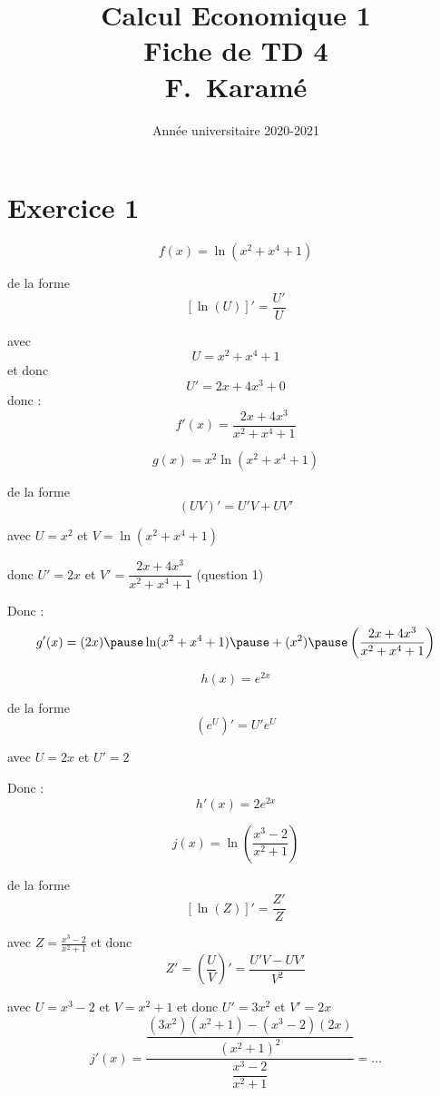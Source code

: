 \documentclass[9pt,handout,professionalfonts,hyperref]{beamer}
\title{Calcul Economique 1\\Fiche de TD 4\\F.~Karamé}
\date{Année universitaire 2020-2021}
\begin{document}
\begin{frame}
\titlepage
\end{frame}

\section{Exercice 1}

\begin{frame}
$$f(x)=\ln(x^2+x^4+1)$$

\pause de la forme $$[\ln(U)]'=\frac{U'}{U}$$

\pause
avec $$U=x^2+x^4+1$$
et donc  
\pause $$U'=2x+4x^3+0$$
\medskip
\pause donc :
\pause
$$f'(x)=\dfrac{2x+4x^3}{x^2+x^4+1}$$

\end{frame}

\begin{frame}

$$
g(x)=x^2\ln(x^2+x^4+1)
$$

\pause de la forme $$(UV)'=U'V+UV'$$

\medskip
 
\pause avec $U=x^2$ et $V=\ln(x^2+x^4+1)$

\pause
\medskip

donc $U'=2x$ \pause et $V'=\dfrac{2x+4x^3}{x^2+x^4+1}$ (question 1)
 \pause
\medskip

Donc : 
$$
g'(x)=(2x)\pause\ln(x^2+x^4+1)\pause+(x^2)\pause\left(\dfrac{2x+4x^3}{x^2+x^4+1}\right)
$$

\end{frame}


\begin{frame}

$$
h(x)=e^{2x}
$$

 \pause de la forme $$(e^U)'=U'e^U$$

 \medskip
\pause avec $U=2x$ et $U'=2$
 \pause
\medskip

Donc : 
$$
h'(x)=2e^{2x}
$$

\end{frame}


\begin{frame}

$$
j(x)=\ln\left(\dfrac{x^3-2}{x^2+1}\right)
$$

 \pause de la forme $$[\ln(Z)]'=\frac{Z'}{Z}$$ 
 \medskip
 
\pause  avec $Z=\frac{x^3-2}{x^2+1}$ \pause et donc $$Z'=\left(\frac{U}{V}\right)'=\frac{U'V-UV'}{V^2}$$
\pause

avec $U = x^3-2$ et $V=x^2+1$ \pause et donc $U' = 3x^2$ \pause et $V'=2x$ \\
\medskip
\pause 
$$j'(x)=\frac{\dfrac{(3x^2)(x^2+1)-(x^3-2)(2x)}{(x^2+1)^2}}{\dfrac{x^3-2}{x^2+1}}=\dots$$

\end{frame}
\end{document}
